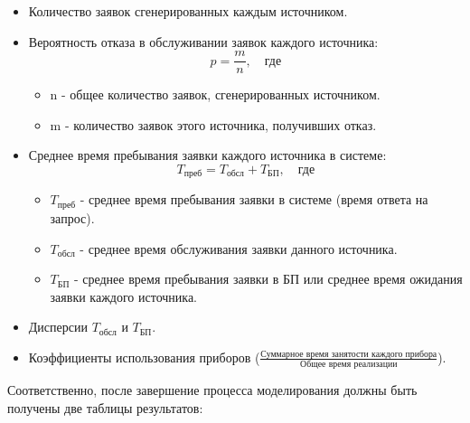 \documentclass[a4paper, 14pt]{article}
\begin{document}
\begin{itemize}
	\item Количество заявок сгенерированных каждым источником.
	\item Вероятность отказа в обслуживании заявок каждого источника:
	      $$p=\frac{m}{n}, \quad \text{где}$$
	      \begin{itemize}
		      \item n - общее количество заявок, сгенерированных источником.
		      \item m - количество заявок этого источника, получивших отказ.
	      \end{itemize}
	\item Среднее время пребывания заявки каждого источника в системе:
	      $$T_{\text{преб}} = T_{\text{обсл}} + T_{\text{БП}}, \quad \text{где}$$
	      \begin{itemize}
		      \item $T_{\text{преб}}$ - среднее время пребывания заявки в системе (время ответа на запрос).
		      \item $T_{\text{обсл}}$ - среднее время обслуживания заявки данного источника.
		      \item $T_{\text{БП}}$ - среднее время пребывания заявки в БП или среднее время ожидания заявки каждого источника.
	      \end{itemize}
	\item Дисперсии $T_{\text{обсл}}$ и $T_{\text{БП}}$.
	\item Коэффициенты использования приборов ($\frac{\text{Суммарное время занятости каждого прибора}}{\text{Общее время реализации}}$).
\end{itemize}

Соответственно, после завершение процесса моделирования должны быть получены две таблицы результатов:
\end{document}
